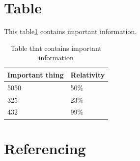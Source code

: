 \documentclass{article}
\begin{document}
\section{Table}
This table\ref{table:data} contains important information.
\begin{table}[h!]
\centering
\begin{tabular}{|l|l|}
\hline
Important thing & Relativity \\ \hline
5050            & 50\%       \\ \hline
325             & 23\%       \\ \hline
432             & 99\%       \\ \hline
\end{tabular}
\caption{Table that contains important information}
\label{table:data}
\end{table}

\newpage
\section{Referencing}
\printbibliography
\end{document}
